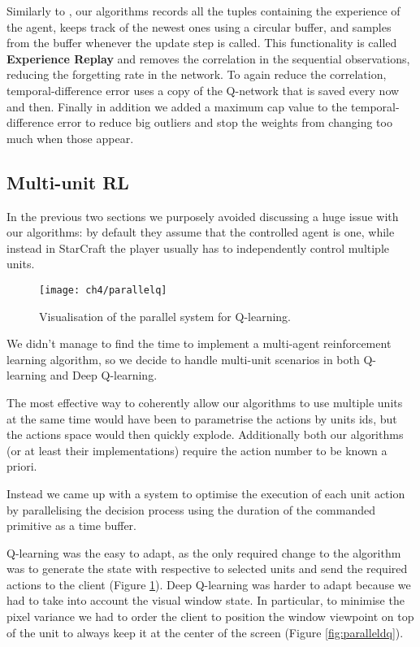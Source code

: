 
Similarly to \cite{mnih_et_al}, our algorithms records all the tuples containing
the experience of the agent, keeps track of the newest ones using a circular
buffer, and samples from the buffer whenever the update step is called. This
functionality is called \textbf{Experience Replay} and removes the correlation
in the sequential observations, reducing the forgetting rate in the network. To
again reduce the correlation, temporal-difference error uses a copy of the
Q-network that is saved every now and then. Finally in addition we added a
maximum cap value to the temporal-difference error to reduce big outliers and
stop the weights from changing too much when those appear.


\subsection{Multi-unit RL}

In the previous two sections we purposely avoided discussing a huge issue with
our algorithms: by default they assume that the controlled agent is one, while
instead in StarCraft the player usually has to independently control multiple
units.

\begin{figure}[h]
    \centering
    \texttt{[image: ch4/parallelq]}
    \caption{Visualisation of the parallel system for Q-learning.}
    \label{fig:parallelq}
\end{figure}

We didn't manage to find the time to implement a multi-agent reinforcement
learning algorithm, so we decide to handle multi-unit scenarios in both
Q-learning and Deep Q-learning. 

The most effective way to coherently allow our algorithms to use multiple units
at the same time would have been to parametrise the actions by units ids, but
the actions space would then quickly explode. Additionally both our algorithms
(or at least their implementations) require the action number to be known
a priori.

Instead we came up with a system to optimise the execution of each unit action
by parallelising the decision process using the duration of the commanded
primitive as a time buffer.


Q-learning was the easy to adapt, as the only required change to the algorithm
was to generate the state with respective to selected units and send the
required actions to the client (Figure \ref{fig:parallelq}). Deep Q-learning was
harder to adapt because we had to take into account the visual window state. In
particular, to minimise the pixel variance we had to order the client to
position the window viewpoint on top of the unit to always keep it at the center
of the screen (Figure \ref{fig:paralleldq}).

